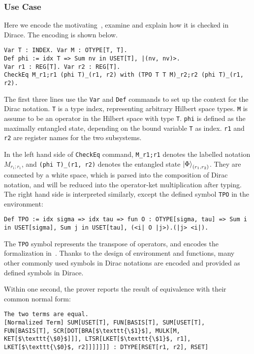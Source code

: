 \documentclass[runningheads]{llncs}
\begin{document}
\subsubsection{Use Case}
Here we encode the motivating~, examine and explain how it is checked in Dirace. The encoding is shown below.

    \begin{lstlisting}[style=dirace]
Var T : INDEX. Var M : OTYPE[T, T].
Def phi := idx T => Sum nv in USET[T], |(nv, nv)>.
Var r1 : REG[T]. Var r2 : REG[T].
CheckEq M_r1;r1 (phi T)_(r1, r2) with (TPO T T M)_r2;r2 (phi T)_(r1, r2).
    \end{lstlisting}        

The first three lines use the \texttt{\textcolor{NavyBlue}{Var}} and \texttt{\textcolor{NavyBlue}{Def}} commands to set up the context for the Dirac notation.
\texttt{T} is a type index, representing arbitrary Hilbert space types. \texttt{M} is assume to be an operator in the Hilbert space with type \texttt{T}. \texttt{phi} is defined as the maximally entangled state, depending on the bound variable \texttt{T} as index.
\texttt{r1} and \texttt{r2} are register names for the two subsystems.

In the left hand side of \texttt{\textcolor{NavyBlue}{CheckEq}} command, \texttt{M\_r1;r1} denotes the labelled notation $M_{r_1; r_1}$, and \texttt{(phi T)\_(r1, r2)} denotes the entangled state $\ket{\Phi}_{(r_1, r_2)}$. They are connected by a white space, which is parsed into the composition of Dirac notation, and will be reduced into the operator-ket multiplication after typing. The right hand side is interpreted similarly, except the defined symbol \texttt{TPO} in the environment:

\begin{lstlisting}[style=dirace]
Def TPO := idx sigma => idx tau => fun O : OTYPE[sigma, tau] => Sum i in USET[sigma], Sum j in USET[tau], (<i| O |j>).(|j> <i|).
\end{lstlisting}

The \texttt{TPO} symbol represents the transpose of operators, and encodes the formalization in~. Thanks to the design of environment and functions, many other commonly used symbols in Dirac notations are encoded and provided as defined symbols in Dirace.

Within one second, the prover reports the result of equivalence with their common normal form:
    \begin{lstlisting}[style=dirace]
The two terms are equal.
[Normalized Term] SUM[USET[T], FUN[BASIS[T], SUM[USET[T], FUN[BASIS[T], SCR[DOT[BRA[$\texttt{\$1}$], MULK[M, KET[$\texttt{\$0}$]]], LTSR[LKET[$\texttt{\$1}$, r1], LKET[$\texttt{\$0}$, r2]]]]]]] : DTYPE[RSET[r1, r2], RSET]
    \end{lstlisting}
\end{document}
